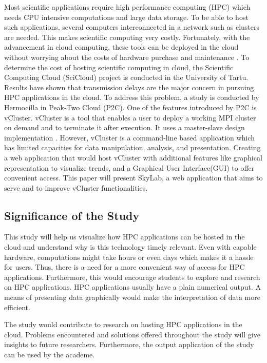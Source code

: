 \documentclass[journal]{./IEEE/IEEEtran}
\begin{document}
	Most scientific applications require high performance computing (HPC) which needs CPU intensive computations and large data storage. To be able to host such applications, several computers interconnected in a network such as clusters are needed. This makes scientific computing very costly. Fortunately, with the advancement in cloud computing, these tools can be deployed in the cloud without worrying about the costs of hardware purchase and maintenance \cite {Ahuja2012}. To determine the cost of hosting scientific computing in cloud, the Scientific Computing Cloud (SciCloud) project is conducted in the University of Tartu. Results have shown that transmission delays are the major concern in pursuing HPC applications in the cloud\cite {Brandic2011}.  To address this problem, a study is conducted by Hermocilla in Peak-Two Cloud (P2C). One of the features introduced by P2C is vCluster. vCluster is a tool that enables a user to deploy a working MPI cluster on demand and to terminate it after execution. It uses a master-slave design implementation \cite {Hermocilla2014}. However, vCluster is a command-line based application which has limited capacities for data manipulation, analysis, and presentation. Creating a web application that would host vCluster with additional features like graphical representation to visualize trends, and a Graphical User Interface(GUI) to offer convenient access. This paper will present SkyLab, a web application that aims to serve and to improve vCluster functionalities.

    \subsection{Significance of the Study}
    This study will help us visualize how HPC applications can be hosted in the cloud and understand why is this technology timely relevant.  Even with capable hardware, computations might take hours or even days which makes it a hassle for users. Thus, there is a need for a more convenient way of access for HPC applications. Furthermore, this would encourage students to explore and research on HPC applications. HPC applications usually have a plain numerical output. A means of presenting data graphically would make the interpretation of data more efficient.

    The study would contribute to research on hosting HPC applications in the cloud. Problems encountered and solutions offered throughout the study will give insights to future researchers. Furthermore, the output application of the study can be used by the academe.
\end{document}
